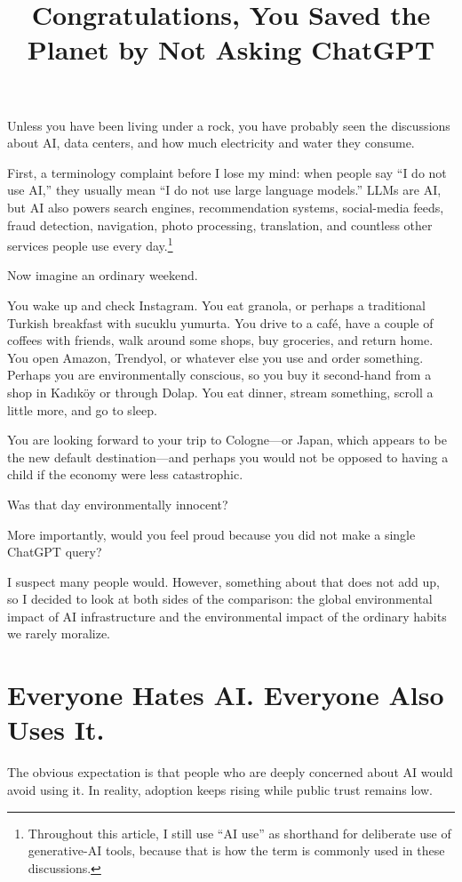 \documentclass{article}
\title{\textbf{Congratulations, You Saved the Planet by Not Asking ChatGPT}}
\date{}
\begin{document}
\maketitle

Unless you have been living under a rock, you have probably seen the discussions about AI, data centers, and how much electricity and water they consume.

First, a terminology complaint before I lose my mind: when people say ``I do not use AI,'' they usually mean ``I do not use large language models.'' LLMs are AI, but AI also powers search engines, recommendation systems, social-media feeds, fraud detection, navigation, photo processing, translation, and countless other services people use every day.\footnote{Throughout this article, I still use ``AI use'' as shorthand for deliberate use of generative-AI tools, because that is how the term is commonly used in these discussions.}

Now imagine an ordinary weekend.

You wake up and check Instagram. You eat granola, or perhaps a traditional Turkish breakfast with sucuklu yumurta. You drive to a café, have a couple of coffees with friends, walk around some shops, buy groceries, and return home. You open Amazon, Trendyol, or whatever else you use and order something. Perhaps you are environmentally conscious, so you buy it second-hand from a shop in Kadıköy or through Dolap. You eat dinner, stream something, scroll a little more, and go to sleep.

You are looking forward to your trip to Cologne---or Japan, which appears to be the new default destination---and perhaps you would not be opposed to having a child if the economy were less catastrophic.

Was that day environmentally innocent?

More importantly, would you feel proud because you did not make a single ChatGPT query?

I suspect many people would. However, something about that does not add up, so I decided to look at both sides of the comparison: the global environmental impact of AI infrastructure and the environmental impact of the ordinary habits we rarely moralize.

\section*{Everyone Hates AI. Everyone Also Uses It.}

The obvious expectation is that people who are deeply concerned about AI would avoid using it. In reality, adoption keeps rising while public trust remains low.
\end{document}
